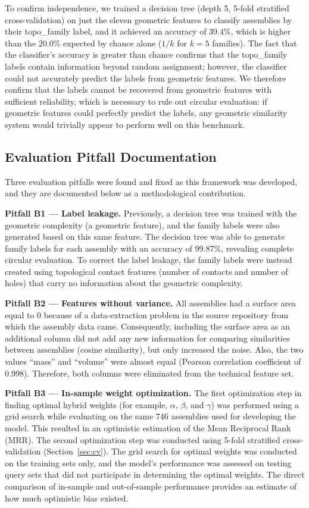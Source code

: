 \documentclass[preprint,12pt]{elsarticle}
\begin{document}
To confirm independence, we trained a decision tree (depth 5, 5-fold stratified cross-validation) on just the eleven geometric features to classify assemblies by their topo\_family label, and it achieved an accuracy of 39.4\%, which is higher than the 20.0\% expected by chance alone ($1/k$ for $k{=}5$ families).
The fact that the classifier's accuracy is greater than chance confirms that the topo\_family labels contain information beyond random assignment; however, the classifier could not accurately predict the labels from geometric features.
We therefore confirm that the labels cannot be recovered from geometric features with sufficient reliability, which is necessary to rule out circular evaluation: if geometric features could perfectly predict the labels, any geometric similarity system would trivially appear to perform well on this benchmark.

\subsection{Evaluation Pitfall Documentation}

Three evaluation pitfalls were found and fixed as this framework was developed, and they are documented below as a methodological contribution.

\textbf{Pitfall B1 --- Label leakage.} Previously, a decision tree was trained with the geometric complexity (a geometric feature), and the family labels were also generated based on this same feature. The decision tree was able to generate family labels for each assembly with an accuracy of 99.87\%, revealing complete circular evaluation. To correct the label leakage, the family labels were instead created using topological contact features (number of contacts and number of holes) that carry no information about the geometric complexity.

\textbf{Pitfall B2 --- Features without variance.} All assemblies had a surface area equal to 0 because of a data-extraction problem in the source repository from which the assembly data came. Consequently, including the surface area as an additional column did not add any new information for comparing similarities between assemblies (cosine similarity), but only increased the noise. Also, the two values ``mass'' and ``volume'' were almost equal (Pearson correlation coefficient of 0.998). Therefore, both columns were eliminated from the technical feature set.

\textbf{Pitfall B3 --- In-sample weight optimization.} The first optimization step in finding optimal hybrid weights (for example, $\alpha$, $\beta$, and $\gamma$) was performed using a grid search while evaluating on the same 746 assemblies used for developing the model. This resulted in an optimistic estimation of the Mean Reciprocal Rank (MRR). The second optimization step was conducted using 5-fold stratified cross-validation (Section~\ref{sec:cv}). The grid search for optimal weights was conducted on the training sets only, and the model's performance was assessed on testing query sets that did not participate in determining the optimal weights. The direct comparison of in-sample and out-of-sample performance provides an estimate of how much optimistic bias existed.
\end{document}
